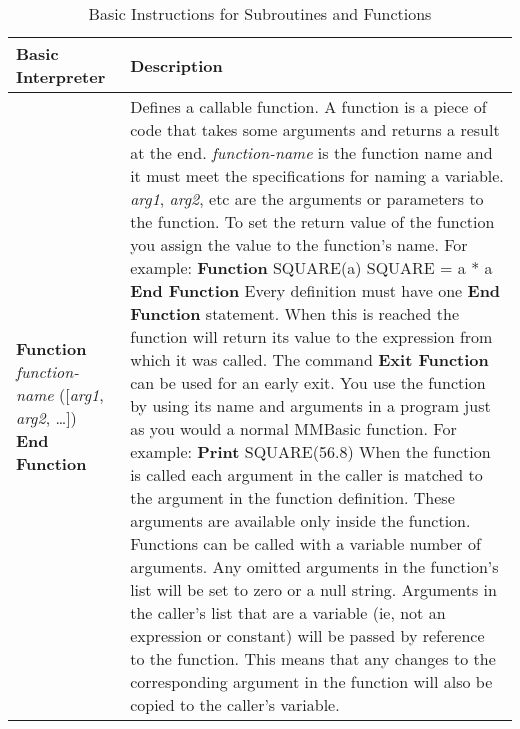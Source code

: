 \begin{table}[]
\centering
\caption{Basic Instructions for Subroutines and Functions}
\label{Basic_Instructions_for_Subroutines_and_Functions}
\begin{tabular}{|p{4cm}|p{10cm}|}
\hline
\textbf{Basic Interpreter} & \textbf{Description}                                                         \\ \hline
\textbf{Function} \textit{function-name} ([\textit{arg1}, \textit{arg2}, …])\newline
[<statements>\newline
xxx = <return value>
\textbf{Exit Function}]\newline
\textbf{End Function}
& Defines a callable function. A function is a piece of code that takes some arguments and returns a result at the end.\newline
\textit{function-name} is the function name and it must meet the specifications for naming
a variable. \textit{arg1}, \textit{arg2}, etc are the arguments or parameters to the
function.\newline
To set the return value of the function you assign the value to the
function's name. For example:\newline
\textbf{Function} SQUARE(a)\newline
SQUARE = a * a\newline
\textbf{End Function}\newline
Every definition must have one \textbf{End Function} statement. When this
is reached the function will return its value to the expression from which
it was called. The command \textbf{Exit Function} can be used for an early
exit.\newline
You use the function by using its name and arguments in a program just
as you would a normal MMBasic function. For example:\newline
\textbf{Print} SQUARE(56.8)\newline
When the function is called each argument in the caller is matched to the
argument in the function definition. These arguments are available only
inside the function.\newline
Functions can be called with a variable number of arguments. Any
omitted arguments in the function's list will be set to zero or a null string.
Arguments in the caller's list that are a variable (ie, not an expression or
constant) will be passed by reference to the function. This means that
any changes to the corresponding argument in the function will also be
copied to the caller's variable.\newline

\end{tabular}
\end{table}
